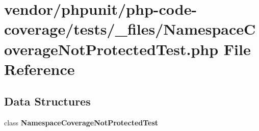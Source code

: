 \section{vendor/phpunit/php-\/code-\/coverage/tests/\+\_\+files/\+Namespace\+Coverage\+Not\+Protected\+Test.php File Reference}
\label{php-code-coverage_2tests_2__files_2_namespace_coverage_not_protected_test_8php}
\subsection*{Data Structures}
\begin{DoxyCompactItemize}
\item 
class {\bf Namespace\+Coverage\+Not\+Protected\+Test}
\end{DoxyCompactItemize}
